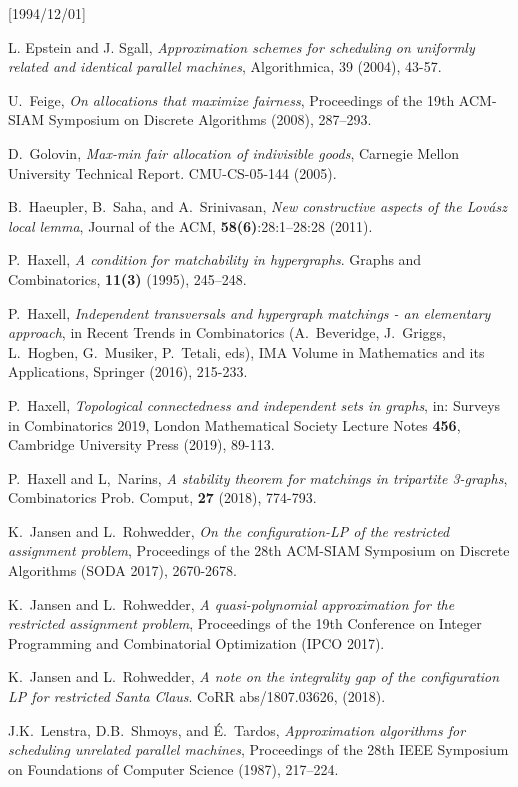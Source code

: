 \NeedsTeXFormat{LaTeX2e}[1994/12/01]\documentclass[letterpaper, 11pt]{article}
\theoremstyle{definition}
\theoremstyle{remark}
\numberwithin{equation}{section}
\begin{document}
\begin{thebibliography}{10}
L. Epstein and J. Sgall, \emph{Approximation schemes for scheduling on
  uniformly related and identical parallel machines}, Algorithmica, 39
(2004), 43-57.

U.~Feige, \emph{On allocations that maximize fairness}, Proceedings of
the 19th ACM-SIAM 
Symposium on Discrete Algorithms (2008), 287–293.

D.~Golovin, \emph{Max-min fair allocation of indivisible goods},
Carnegie Mellon University Technical Report. CMU-CS-05-144 (2005).

B.~Haeupler, B.~Saha, and A.~Srinivasan, \emph{New constructive aspects
  of the Lov\'asz local lemma}, 
Journal of the ACM, \textbf{58(6)}:28:1–28:28 (2011).

P.~Haxell, \emph{A condition for matchability in hypergraphs}. Graphs
and Combinatorics, \textbf{11(3)} (1995), 245–248.

P.~Haxell, \emph{Independent transversals and hypergraph matchings - an elementary approach}, in Recent Trends in Combinatorics (A.~Beveridge, J.~Griggs, L.~Hogben, G.~Musiker, P.~Tetali, eds), IMA Volume in Mathematics and its Applications, Springer (2016),  215-233. 

P.~Haxell, \emph{Topological connectedness and independent sets in
  graphs}, in: Surveys in Combinatorics 2019, London Mathematical
Society Lecture Notes \textbf{456}, Cambridge University Press (2019), 89-113.

P.~Haxell and L,~Narins, \emph{A stability theorem for matchings in
  tripartite 3-graphs}, Combinatorics Prob. Comput, \textbf{27}
(2018), 774-793.

  K.~Jansen and L.~Rohwedder, \emph{On the configuration-LP of the
  restricted assignment problem}, Proceedings of the 28th ACM-SIAM
Symposium on Discrete Algorithms (SODA 2017), 2670-2678. 

  K.~Jansen and L.~Rohwedder, \emph{A quasi-polynomial approximation for
    the restricted assignment problem}, Proceedings of the 19th
  Conference on Integer Programming and Combinatorial Optimization
  (IPCO 2017). 

K.~Jansen and L.~Rohwedder, \emph{A note on the integrality gap of the
  configuration LP for restricted Santa Claus}. CoRR abs/1807.03626, (2018).

J.K.~Lenstra, D.B.~Shmoys, and \'E.~Tardos,  \emph{Approximation
  algorithms for scheduling unrelated 
parallel machines}, Proceedings of the 28th IEEE Symposium on
Foundations of Computer Science (1987), 217–224.


\end{thebibliography}
\end{document}

